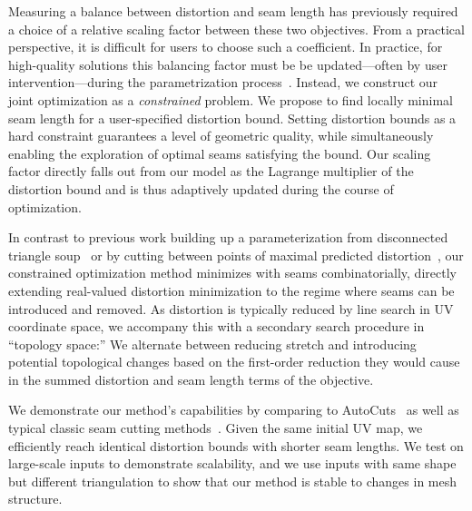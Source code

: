 Measuring a balance between distortion and seam length has previously required a choice of a relative scaling factor between these two objectives.  From a practical perspective, it is difficult for users to choose such a coefficient. %
In practice, for high-quality solutions this balancing factor must be %
be updated---often by user intervention---during the parametrization process\ \cite{Poranne2017Autocuts}. Instead, we construct our joint optimization as a \emph{constrained} problem. We propose to find locally minimal seam length for a user-specified distortion bound. Setting distortion bounds as a hard constraint guarantees a level of geometric quality, while simultaneously enabling the exploration of optimal seams satisfying the bound. %
Our scaling factor directly falls out from our model as the Lagrange multiplier of the distortion bound and is thus adaptively updated during the course of optimization.  %

In contrast to previous work building up a parameterization from disconnected triangle soup~\cite{Poranne2017Autocuts} or by cutting between points of maximal predicted distortion~\cite{Gu2002Geometry,Sheffer2002Seamster}, our constrained optimization method minimizes with seams combinatorially, directly extending real-valued distortion minimization to the regime where seams can be introduced and removed. As distortion is typically reduced by line search in UV coordinate space, we accompany this with a secondary search procedure in ``topology space:'' We alternate between reducing stretch and introducing potential topological changes based on the first-order reduction they would cause in the summed distortion and seam length terms of the objective. %


We demonstrate our method's capabilities by comparing to AutoCuts~\cite{Poranne2017Autocuts} as well as typical classic seam cutting methods~\cite{Gu2002Geometry,Sheffer2002Seamster}. %
Given the same initial UV map, we efficiently reach identical distortion bounds with shorter seam lengths. We test on large-scale inputs to demonstrate scalability, and we use inputs with same shape but different triangulation to show that our method is stable to changes in mesh structure.

